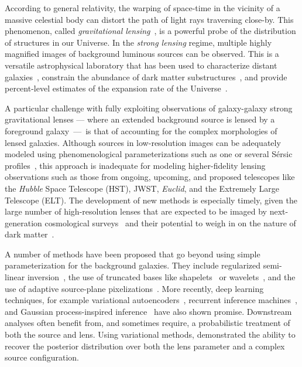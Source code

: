 \documentclass[nohyperref]{article}
\theoremstyle{plain}
\theoremstyle{definition}
\theoremstyle{remark}
\begin{document}
According to general relativity, the warping of space-time in the vicinity of a massive celestial body can distort the path of light rays traversing close-by. This phenomenon, called \textit{gravitational lensing}~\cite{Einstein1936LENS}, is a powerful probe of the distribution of structures in our Universe. In the \emph{strong lensing} regime, multiple highly magnified images of background luminous sources can be observed.  This is a versatile astrophysical laboratory that has been used to characterize distant galaxies~\cite{wuyts2012constraints,yuan2017most}, constrain the abundance of dark matter substructures~\cite{dalal2002direct,vegetti2014inference,hezaveh2016detection,gilman2019warm,hsueh2020sharp,csengul2021substructure,meneghetti2020excess}, and provide percent-level estimates of the expansion rate of the Universe~\cite{birrer2020tdcosmo}.

A particular challenge with fully exploiting observations of galaxy-galaxy strong gravitational lenses --- where an extended background source is lensed by a foreground galaxy~---~is that of accounting for the complex morphologies of lensed galaxies. Although sources in low-resolution images can be adequately modeled using phenomenological parameterizations such as one or several S\'{e}rsic profiles~\citep{sersic1963influence}, this approach is inadequate for modeling higher-fidelity lensing observations such as those from ongoing, upcoming, and proposed telescopes like the \emph{Hubble} Space Telescope (HST), JWST, \emph{Euclid}, and the Extremely Large Telescope (ELT). The development of new methods is especially timely, given the large number of high-resolution lenses that are expected to be imaged by next-generation cosmological surveys~\citep{collett2015population} and their potential to weigh in on the nature of dark matter~\cite{simon2019testing}.

A number of methods have been proposed that go beyond using simple parameterization for the background galaxies. They include regularized semi-linear inversion~\citep{warren2003semilinear}, the use of truncated bases like shapelets~\citep{birrer2015gravitational,birrer2018lenstronomy} or wavelets~\citep{galan2021slitronomy}, and the use of adaptive source-plane pixelizations~\citep{vegetti2009bayesian,nightingale2018autolens}. More recently, deep learning techniques, for example variational autoencoders~\citep{chianese2020differentiable}, recurrent inference machines~\citep{morningstar2019data}, and Gaussian process-inspired inference~\citep{karchev2022strong} have also shown promise. 
Downstream analyses often benefit from, and sometimes require, a probabilistic treatment of both the source and lens. Using variational methods, \citealt{karchev2022strong} demonstrated the ability to recover the posterior distribution over both the lens parameter and a complex source configuration.
\end{document}
